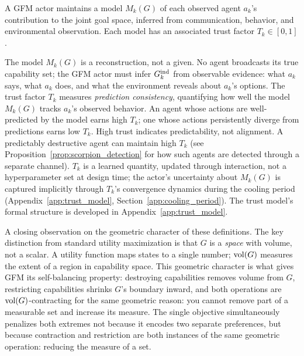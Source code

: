 
\begin{definition}
\label{def:observable_goal_model}
A GFM actor maintains a model $M_k(G)$ of each observed agent $a_k$'s
    contribution to the joint goal space, inferred from communication,
    behavior, and environmental observation. Each model has an associated trust
    factor $T_k \in [0, 1]$.
\end{definition}

The model $M_k(G)$ is a reconstruction, not a given. No agent broadcasts its
true capability set; the GFM actor must infer $G_{k}^{\mathrm{ind}}$ from observable
evidence: what $a_k$ says, what $a_k$ does, and what the environment reveals
about $a_k$'s options. The trust factor $T_k$ measures \emph{prediction
consistency}, quantifying how well the model $M_k(G)$ tracks $a_k$'s observed
behavior. An agent whose actions are well-predicted by the model earns high
$T_k$; one whose actions persistently diverge from predictions earns low $T_k$.
High trust indicates predictability, not alignment. A predictably destructive
agent can maintain high $T_k$ (see Proposition~\ref{prop:scorpion_detection}
for how such agents are detected through a separate channel). $T_k$ is a
learned quantity, updated through interaction, not a hyperparameter set at
design time; the actor's uncertainty about $M_k(G)$ is captured implicitly
through $T_k$'s convergence dynamics during the cooling period
(Appendix~\ref{app:trust_model}, Section~\ref{app:cooling_period}). The trust
model's formal structure is developed in Appendix~\ref{app:trust_model}.

\medskip

A closing observation on the geometric character of these definitions. The key
distinction from standard utility maximization is that $G$ is a \emph{space}
with volume, not a scalar. A utility function maps states to a single number;
$\operatorname{vol}(G)$ measures the extent of a region in capability space. This geometric
character is what gives GFM its self-balancing property: destroying
capabilities removes volume from $G$, restricting capabilities shrinks $G$'s
boundary inward, and both operations are $\operatorname{vol}(G)$-contracting for the same
geometric reason: you cannot remove part of a measurable set and increase its
measure. The single objective simultaneously penalizes both extremes not
because it encodes two separate preferences, but because contraction and
restriction are both instances of the same geometric operation: reducing the
measure of a set.
